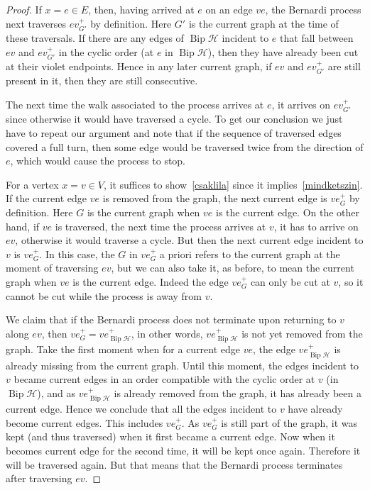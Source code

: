 \documentclass[ALCO,ThmDefs,Unicode,epreuves]{cedram}
\newcommand{\HH}{\mathcal H}
\DeclareMathOperator{\bip}{Bip}
\begin{document}
\begin{proof}
If $x=e\in E$, then, having arrived at $e$ on an edge $ve$, the Bernardi process next traverses $ev_{G'}^+$ by definition. Here $G'$ is the current graph at the time of these traversals. If there are any edges of $\bip\HH$ incident to $e$ that fall between $ev$ and $ev_{G'}^+$ in the cyclic order (at $e$ in $\bip\HH$), then they have already been cut at their violet endpoints. Hence in any later current graph, if $ev$ and $ev_{G'}^+$ are still present in it, then they are still consecutive.

The next time the walk associated to the process arrives at $e$, it arrives on $ev^+_{G'}$ since otherwise it would have traversed a cycle. To get our conclusion we just have to repeat our argument and note that if the sequence of traversed edges covered a full turn, then some edge would be traversed twice from the direction of $e$, which would cause the process to stop.

For a vertex $x=v\in V$, it suffices to show~\ref{csaklila} since it implies~\ref{mindketszin}. If the current edge $ve$ is removed from the graph, the next current edge is $ve_G^+$ by definition. Here $G$ is the current graph when $ve$ is the current edge. On the other hand, if $ve$ is traversed, the next time the process arrives at $v$, it has to arrive on $ev$, otherwise it would traverse a cycle. But then the next current edge incident to $v$ is $ve_G^+$. In this case, the $G$ in $ve_G^+$ a priori refers to the current graph at the moment of traversing $ev$, but we can also take it, as before, to mean the current graph when $ve$ is the current edge. Indeed the edge $ve_G^+$ can only be cut at $v$, so it cannot be cut while the process is away from $v$.

We claim that if the Bernardi process does not terminate upon returning to $v$ along $ev$, then $ve_G^+=ve_{\bip \HH}^+$, in other words, $ve_{\bip \HH}^+$ is not yet removed from the graph. Take the first moment when for a current edge $ve$, the edge $ve_{\bip \HH}^+$ is already missing from the current graph. Until this moment, the edges incident to $v$ became current edges in an order compatible with the cyclic order at $v$ (in $\bip \HH$), and as $ve_{\bip \HH}^+$ is already removed from the graph, it has already been a current edge. Hence we conclude that all the edges incident to $v$ have already become current edges. This includes $ve_G^+$. As $ve_G^+$ is still part of the graph, it was kept (and thus traversed) when it first became a current edge. Now when it becomes current edge for the second time, it will be kept once again. Therefore it will be traversed again. But that means that the Bernardi process terminates after traversing $ev$.
\end{proof}
\end{document}
